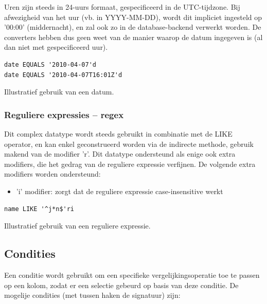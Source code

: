 Uren zijn steeds in 24-uurs formaat, gespecificeerd in de UTC-tijdzone. Bij afwezigheid van het uur (vb. in YYYY-MM-DD), wordt dit impliciet ingesteld op '00:00' (middernacht), en zal ook zo in de database-backend verwerkt worden. De converters hebben dus geen weet van de manier waarop de datum ingegeven is (al dan niet met gespecificeerd uur).

\begin{code}
\begin{verbatim}
date EQUALS '2010-04-07'd
date EQUALS '2010-04-07T16:01Z'd
\end{verbatim}
\caption{Illustratief gebruik van een datum.}
\end{code}

\subsubsection{Reguliere expressies -- regex}

Dit complex datatype wordt steeds gebruikt in combinatie met de LIKE operator, en kan enkel geconstrueerd worden via de indirecte methode, gebruik makend van de modifier 'r'. Dit datatype ondersteund als enige ook extra modifiers, die het gedrag van de reguliere expressie verfijnen. De volgende extra modifiers worden ondersteund:
\begin{itemize}
\item 'i' modifier: zorgt dat de reguliere expressie case-insensitive werkt
\end{itemize}

\begin{code}
\begin{verbatim}
name LIKE '^j*n$'ri
\end{verbatim}
\caption{Illustratief gebruik van een reguliere expressie.}
\end{code}

\subsection{Condities}

Een conditie wordt gebruikt om een specifieke vergelijkingsoperatie toe te passen op een kolom, zodat er een selectie gebeurd op basis van deze conditie. De mogelije condities (met tussen haken de signatuur) zijn:

